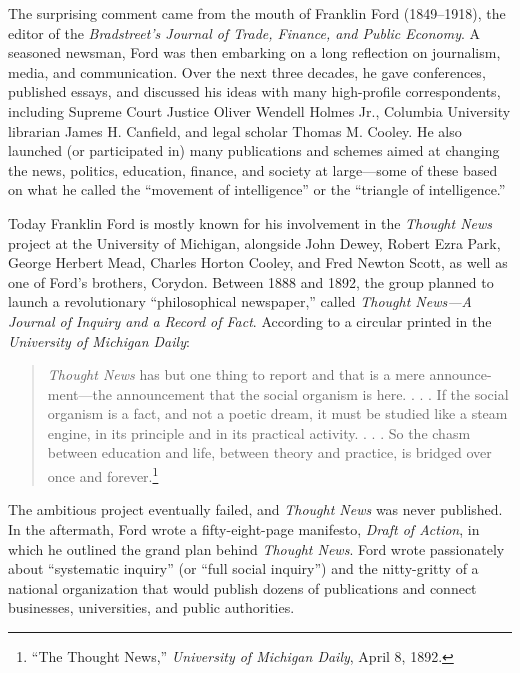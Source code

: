 \documentclass[openany,nobib]{tufte-book}
\begin{document}
The surprising comment came from the mouth of Franklin Ford
(1849--1918), the editor of the \emph{Bradstreet's Journal of Trade,
Finance, and Public Economy}. A seasoned newsman, Ford was then
embarking on a long reflection on journalism, media, and communication.
Over the next three decades, he gave conferences, published essays, and
discussed his ideas with many high-profile correspondents, including
Supreme Court Justice Oliver Wendell Holmes Jr., Columbia University
librarian James H. Canfield, and legal scholar Thomas M. Cooley. He also
launched (or participated in) many publications and schemes aimed at
changing the news, politics, education, finance, and society at
large---some of these based on what he called the ``movement of
intelligence'' or the ``triangle of intelligence.''

Today Franklin Ford is mostly known for his involvement in the
\emph{Thought News} project at the University of Michigan, alongside
John Dewey, Robert Ezra Park, George Herbert Mead, Charles Horton
Cooley, and Fred Newton Scott, as well as one of Ford's brothers,
Corydon. Between 1888 and 1892, the group planned to launch a
revolutionary ``philosophical newspaper,'' called \emph{Thought News---A
Journal of Inquiry and a Record of Fact}. According to a circular
printed in the \emph{University of Michigan Daily}:

\begin{quote}
\emph{Thought News} has but one thing to report and that is a mere
announce-\\\noindent ment---the announcement that the social organism is here. . . .
If the social organism is a fact, and not a poetic dream, it must be
studied like a steam engine, in its principle and in its practical
activity. . . . So the chasm between education and life, between theory
and practice, is bridged over once and forever.\footnote{``The Thought
  News,'' \emph{University of Michigan Daily}, April 8, 1892.}
\end{quote}

\noindent The ambitious project eventually failed, and \emph{Thought News} was
never published. In the aftermath, Ford wrote a fifty-eight-page
manifesto, \emph{Draft of Action}, in which he outlined the grand plan
behind \emph{Thought News}. Ford wrote passionately about ``systematic
inquiry'' (or ``full social inquiry'') and the nitty-gritty of a
national organization that would publish dozens of publications and
connect businesses, universities, and public authorities.
\end{document}
